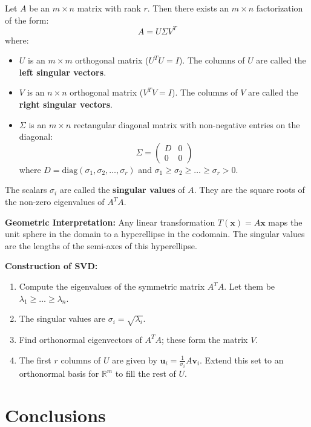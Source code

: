 \documentclass[oneside]{book}
\begin{document}
\begin{theorem}
Let $A$ be an $m \times n$ matrix with rank $r$. Then there exists an $m \times n$ factorization of the form:
\[ A = U \Sigma V^T \]
where:
\begin{itemize}
    \item $U$ is an $m \times m$ orthogonal matrix ($U^T U = I$). The columns of $U$ are called the \textbf{left singular vectors}.
    \item $V$ is an $n \times n$ orthogonal matrix ($V^T V = I$). The columns of $V$ are called the \textbf{right singular vectors}.
    \item $\Sigma$ is an $m \times n$ rectangular diagonal matrix with non-negative entries on the diagonal:
    \[ \Sigma = \begin{pmatrix} D & 0 \\ 0 & 0 \end{pmatrix} \]
    where $D = \text{diag}(\sigma_1, \sigma_2, \dots, \sigma_r)$ and $\sigma_1 \ge \sigma_2 \ge \dots \ge \sigma_r > 0$.
\end{itemize}
The scalars $\sigma_i$ are called the \textbf{singular values} of $A$. They are the square roots of the non-zero eigenvalues of $A^T A$.
\end{theorem}

\textbf{Geometric Interpretation:}
Any linear transformation $T(\mathbf{x}) = A\mathbf{x}$ maps the unit sphere in the domain to a hyperellipse in the codomain. The singular values are the lengths of the semi-axes of this hyperellipse.

\textbf{Construction of SVD:}
\begin{enumerate}
    \item Compute the eigenvalues of the symmetric matrix $A^T A$. Let them be $\lambda_1 \ge \dots \ge \lambda_n$.
    \item The singular values are $\sigma_i = \sqrt{\lambda_i}$.
    \item Find orthonormal eigenvectors of $A^T A$; these form the matrix $V$.
    \item The first $r$ columns of $U$ are given by $\mathbf{u}_i = \frac{1}{\sigma_i} A \mathbf{v}_i$. Extend this set to an orthonormal basis for $\mathbb{R}^m$ to fill the rest of $U$.
\end{enumerate}

\section{Conclusions}
\end{document}
